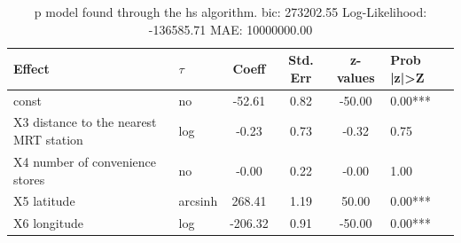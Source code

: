 \begin{table}
	\caption{p model found through the hs algorithm. bic: 273202.55 Log-Likelihood: -136585.71 MAE: 10000000.00}
	\begin{center}
		\begin{tabular}{|l|l|c|c|c|l|}
			\hline
			Effect & $\tau$ & Coeff & Std. Err & z-values & Prob |z|>Z \\
			\hline
			const & no & -52.61 & 0.82 & -50.00 & 0.00*** \\
			\hline
			X3 distance to the nearest MRT station & log & -0.23 & 0.73 & -0.32 & 0.75 \\
			\hline
			X4 number of convenience stores & no & -0.00 & 0.22 & -0.00 & 1.00 \\
			\hline
			X5 latitude & arcsinh & 268.41 & 1.19 & 50.00 & 0.00*** \\
			\hline
			X6 longitude & log & -206.32 & 0.91 & -50.00 & 0.00*** \\
			\hline
		\end{tabular}
	\end{center}
\end{table}